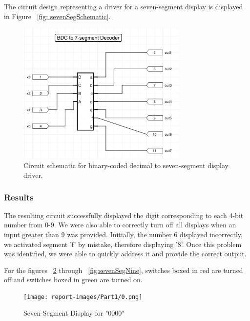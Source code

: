 \documentclass[11pt]{article}
\begin{document}
The circuit design representing a driver for a seven-segment display is displayed in Figure ~\ref{fig: sevenSegSchematic}.

\begin{figure}[H]
\begin{center}
	\includegraphics[width=0.75\textwidth]{report-images/img2.png}
	\caption{\label{fig: sevenSegSchematic} Circuit schematic for binary-coded decimal to seven-segment display driver.}
	\label{fig:sevenSegSchematic}
\end{center}
\end{figure}

\subsubsection{Results}

The resulting circuit successfully displayed the digit corresponding to each 4-bit number from 0-9. We were also able to correctly turn off all displays when an input greater than 9 was provided. Initially, the number 6 displayed incorrectly, we activated segment 'f' by mistake, therefore displaying '8'. Once this problem was identified, we were able to quickly address it and provide the correct output.

\begin{center}
	For the figures ~\ref{fig:sevenSegZero} through ~\ref{fig:sevenSegNine}, switches boxed in red are turned off and switches boxed in green are turned on.
\end{center}

\begin{figure}[H]
\begin{center}
\texttt{[image: report-images/Part1/0.png]}
\caption{Seven-Segment Display for "0000"}
\label{fig:sevenSegZero}
\end{center}
\end{figure}
\end{document}
